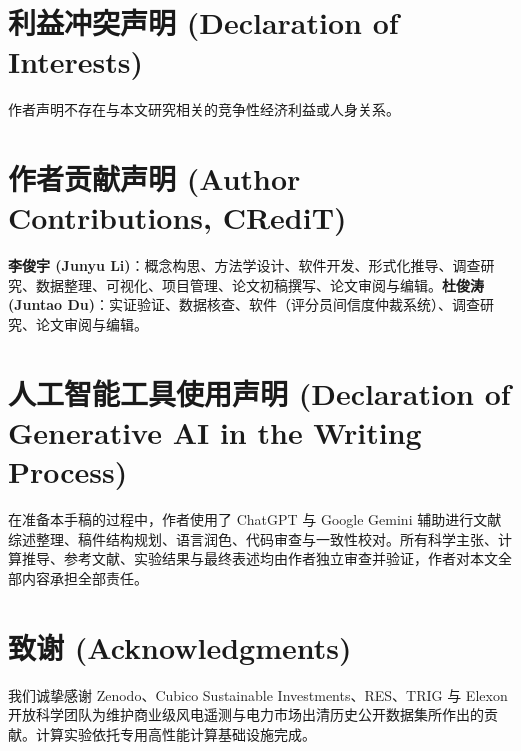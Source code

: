 \documentclass[3p,twocolumn]{elsarticle}
\theoremstyle{definition}
\theoremstyle{remark}
\begin{document}


\appendix


\section*{利益冲突声明 (Declaration of Interests)}
作者声明不存在与本文研究相关的竞争性经济利益或人身关系。

\section*{作者贡献声明 (Author Contributions, CRediT)}
\textbf{李俊宇 (Junyu Li)}：概念构思、方法学设计、软件开发、形式化推导、调查研究、数据整理、可视化、项目管理、论文初稿撰写、论文审阅与编辑。\textbf{杜俊涛 (Juntao Du)}：实证验证、数据核查、软件（评分员间信度仲裁系统）、调查研究、论文审阅与编辑。

\section*{人工智能工具使用声明 (Declaration of Generative AI in the Writing Process)}
在准备本手稿的过程中，作者使用了 ChatGPT 与 Google Gemini 辅助进行文献综述整理、稿件结构规划、语言润色、代码审查与一致性校对。所有科学主张、计算推导、参考文献、实验结果与最终表述均由作者独立审查并验证，作者对本文全部内容承担全部责任。

\section*{致谢 (Acknowledgments)}
我们诚挚感谢 Zenodo、Cubico Sustainable Investments、RES、TRIG 与 Elexon 开放科学团队为维护商业级风电遥测与电力市场出清历史公开数据集所作出的贡献。计算实验依托专用高性能计算基础设施完成。

\setlength{\bibsep}{2.5pt plus 0.5pt minus 0.5pt}
\small

\end{document}
